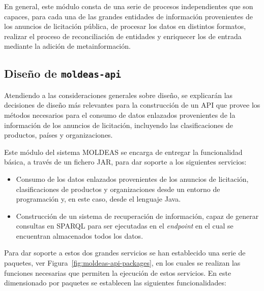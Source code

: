 En general, este módulo consta de una serie de procesos independientes que son capaces, para cada una 
de las grandes entidades de información provenientes de los anuncios de licitación pública, de procesar 
los datos en distintos formatos, realizar el proceso de reconciliación de entidades y enriquecer los 
\datasets de entrada mediante la adición de metainformación. 


\subsection{Diseño de \texttt{moldeas-api}}\label{sect:moldeas-api}
Atendiendo a las consideraciones generales sobre diseño, se explicarán 
las decisiones de diseño más relevantes para la construcción 
de un \gls{API} que provee los métodos necesarios para el consumo de datos 
enlazados provenientes de la información de los anuncios de licitación, 
incluyendo las clasificaciones de productos, países y organizaciones.

Este módulo del sistema \gls{MOLDEAS} se encarga de entregar la funcionalidad 
básica, a través de un fichero \gls{JAR}, para dar soporte a los siguientes servicios:
\begin{itemize}
 \item Consumo de los datos enlazados provenientes de los anuncios de licitación, 
clasificaciones de productos y organizaciones desde un entorno de programación y, 
en este caso, desde el lenguaje Java.
\item Construcción de un sistema de recuperación de información, capaz de generar 
consultas en \gls{SPARQL} para ser ejecutadas en el \textit{endpoint} en el cual se encuentran 
almacenados todos los datos.
\end{itemize}

Para dar soporte a estos dos grandes servicios se han establecido una serie de paquetes, 
ver Figura~\ref{fig:moldeas-api-packages}, en los cuales se realizan las funciones 
necesarias que permiten la ejecución de estos servicios. En este dimensionado por paquetes 
se establecen las siguientes funcionalidades:

